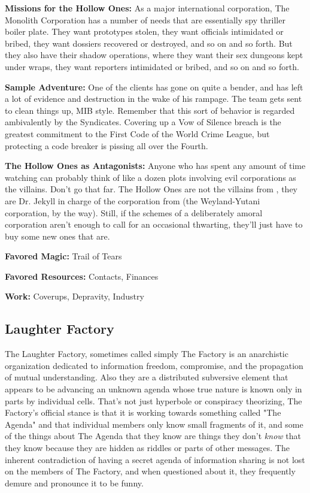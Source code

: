 \textbf{Missions for the Hollow Ones:} As a major international corporation, The Monolith Corporation has a number of needs that are essentially spy thriller boiler plate. They want prototypes stolen, they want officials intimidated or bribed, they want dossiers recovered or destroyed, and so on and so forth. But they also have their shadow operations, where they want their sex dungeons kept under wraps, they want reporters intimidated or bribed, and so on and so forth.

\textbf{Sample Adventure:} One of the clients has gone on quite a bender, and has left a lot of evidence and destruction in the wake of his rampage. The team gets sent to clean things up, MIB style. Remember that this sort of behavior is regarded ambivalently by the Syndicates. Covering up a Vow of Silence breach is the greatest commitment to the First Code of the World Crime League, but protecting a code breaker is pissing all over the Fourth.

\textbf{The Hollow Ones as Antagonists:} Anyone who has spent any amount of time watching  can probably think of like a dozen plots involving evil corporations as the villains. Don't go that far. The Hollow Ones are not the villains from , they are Dr. Jekyll in charge of the corporation from  (the Weyland-Yutani corporation, by the way). Still, if the schemes of a deliberately amoral corporation aren't enough to call for an occasional thwarting, they'll just have to buy some new ones that are.

\textbf{Favored Magic:}  Trail of Tears

\textbf{Favored Resources:} Contacts, Finances

\textbf{Work:} Coverups, Depravity, Industry

\subsection{Laughter Factory} 

The Laughter Factory, sometimes called simply The Factory is an anarchistic organization dedicated to information freedom, compromise, and the propagation of mutual understanding. Also they are a distributed subversive element that appears to be advancing an unknown agenda whose true nature is known only in parts by individual cells. That's not just hyperbole or conspiracy theorizing, The Factory's official stance is that it is working towards something called "The Agenda" and that individual members only know small fragments of it, and some of the things about The Agenda that they know are things they don't \textit{know} that they know because they are hidden as riddles or parts of other messages. The inherent contradiction of having a secret agenda of information sharing is not lost on the members of The Factory, and when questioned about it, they frequently demure and pronounce it to be funny.

